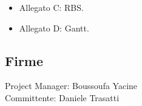 \documentclass{article}
\begin{document}
\begin{flushleft}
\begin{itemize}
			\item Allegato C: RBS.

			\item Allegato D: Gantt.

		\end{itemize}

		\subsection{Firme}

		Project Manager: Boussoufa Yacine\\

		Committente: Daniele Trasatti

		

	\end{flushleft}

	

	


\end{document}
